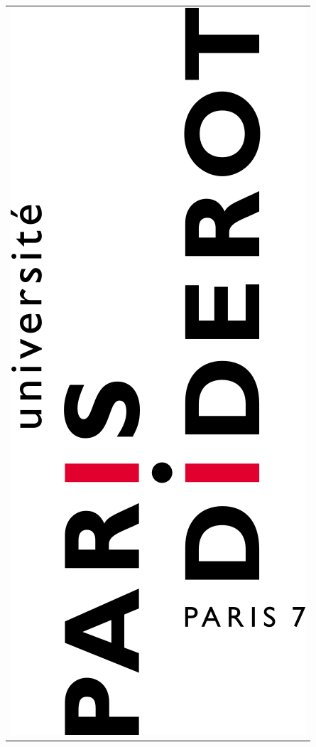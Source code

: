 \documentclass[12pt,a4paper]{article}
\begin{document}
\begin{titlepage}
\begin{sffamily}
\begin{center}
\begin{tabular}{c}
\includegraphics[scale=0.1]{img/p7.png}
\end{tabular}


\end{center}
\end{sffamily}
\end{titlepage}
\end{document}
